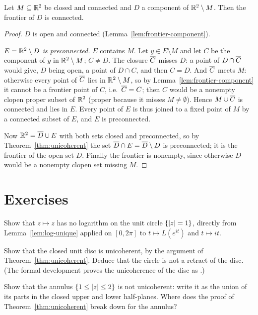 
\begin{theorem}[Brouwer]\label{thm:brouwer}
Let $M\subseteq\mathbb{R}^2$ be closed and connected and $D$ a component of $\mathbb{R}^2\setminus M$. Then the
frontier of $D$ is connected.
\end{theorem}

\begin{proof}
$D$ is open and connected (Lemma~\ref{lem:frontier-component}).

\emph{$E=\mathbb{R}^2\setminus D$ is preconnected.} $E$ contains $M$. Let $y\in E\setminus M$ and let $C$ be
the component of $y$ in $\mathbb{R}^2\setminus M$; $C\neq D$. The closure $\overline{C}$ misses $D$: a point of
$D\cap\overline{C}$ would give, $D$ being open, a point of $D\cap C$, and then $C=D$. And $\overline{C}$ meets $M$:
otherwise every point of $\overline{C}$ lies in $\mathbb{R}^2\setminus M$, so by Lemma~\ref{lem:frontier-component}
it cannot be a frontier point of $C$, i.e.\ $\overline{C}=C$; then $C$ would be a nonempty clopen proper
subset of $\mathbb{R}^2$ (proper because it misses $M\neq\emptyset$). Hence $M\cup\overline{C}$ is connected and lies
in $E$. Every point of $E$ is thus joined to a fixed point of $M$ by a connected subset of $E$, and
$E$ is preconnected.

Now $\mathbb{R}^2=\overline{D}\cup E$ with both sets closed and preconnected, so by
Theorem~\ref{thm:unicoherent} the set $\overline{D}\cap E=\overline{D}\setminus D$ is preconnected; it is the
frontier of the open set $D$. Finally the frontier is nonempty, since otherwise $D$ would be a
nonempty clopen set missing $M$.
\end{proof}


\section*{Exercises}

\begin{exercise}
Show that $z\mapsto z$ has no logarithm on the unit circle $\left\{ \left\lvert z\right\rvert=1 \right\}$, directly from
Lemma~\ref{lem:log-unique} applied on $[0,2\pi]$ to $t\mapsto L(e^{it})$ and $t\mapsto it$.
\end{exercise}

\begin{exercise}
Show that the closed unit disc is unicoherent, by the argument of Theorem~\ref{thm:unicoherent}.
Deduce that the circle is not a retract of the disc. (The formal development proves the
unicoherence of the disc as .)
\end{exercise}

\begin{exercise}
Show that the annulus $\left\{ 1\le\left\lvert z\right\rvert\le2 \right\}$ is not unicoherent: write it as the union of its
parts in the closed upper and lower half-planes. Where does the proof of
Theorem~\ref{thm:unicoherent} break down for the annulus?
\end{exercise}
